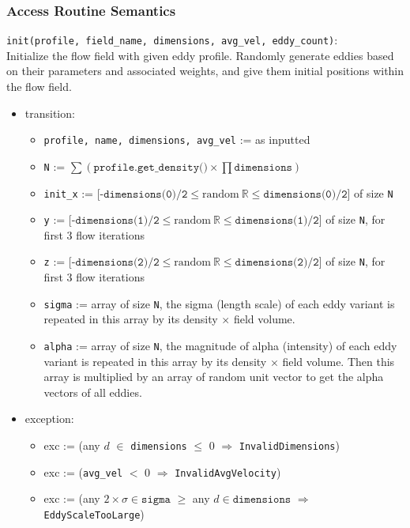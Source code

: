 \documentclass[12pt, titlepage]{article}
\begin{document}
\subsubsection{Access Routine Semantics}

\noindent \texttt{init(profile, field\_name, dimensions, avg\_vel, eddy\_count)}:\\
Initialize the flow field with given eddy profile. Randomly generate eddies based on their parameters and associated weights, and give them initial positions within the flow field.
\begin{itemize}
\item transition: 
  \begin{itemize}
    \item \texttt{profile, name, dimensions, avg\_vel} := as inputted
    \item \texttt{N} := $\sum (\texttt{profile.get\_density()} \times \prod \texttt{dimensions})$
    \item \texttt{init\_x} := [$\texttt{-dimensions(0)/2} \leq \text{random}~\mathbb{R} \leq \texttt{dimensions(0)/2}$] of size \texttt{N}
    \item \texttt{y} := [$\texttt{-dimensions(1)/2} \leq \text{random}~\mathbb{R} \leq \texttt{dimensions(1)/2}$] of size \texttt{N}, for first 3 flow iterations
    \item \texttt{z} := [$\texttt{-dimensions(2)/2} \leq \text{random}~\mathbb{R} \leq \texttt{dimensions(2)/2}$] of size \texttt{N}, for first 3 flow iterations
    \item \texttt{sigma} := array of size \texttt{N}, the sigma (length scale) of each eddy variant is repeated in this array by its density $\times$ field volume.
    \item \texttt{alpha} := array of size \texttt{N}, the magnitude of alpha (intensity) of each eddy variant is repeated in this array by its density $\times$ field volume. Then this array is multiplied by an array of random unit vector to get the alpha vectors of all eddies.
  \end{itemize}
\item exception: 
  \begin{itemize}
    \item exc := (any $d$ $\in$ \texttt{dimensions} $\le$ 0 $\Rightarrow$ \texttt{InvalidDimensions})
    \item exc := (\texttt{avg\_vel} $<$ 0 $\Rightarrow$ \texttt{InvalidAvgVelocity})
    \item exc := (any $2 \times \sigma \in \texttt{sigma}$ $\ge$ any $d \in \texttt{dimensions}$ $\Rightarrow$ \texttt{EddyScaleTooLarge})
  \end{itemize}
\end{itemize}
\end{document}
